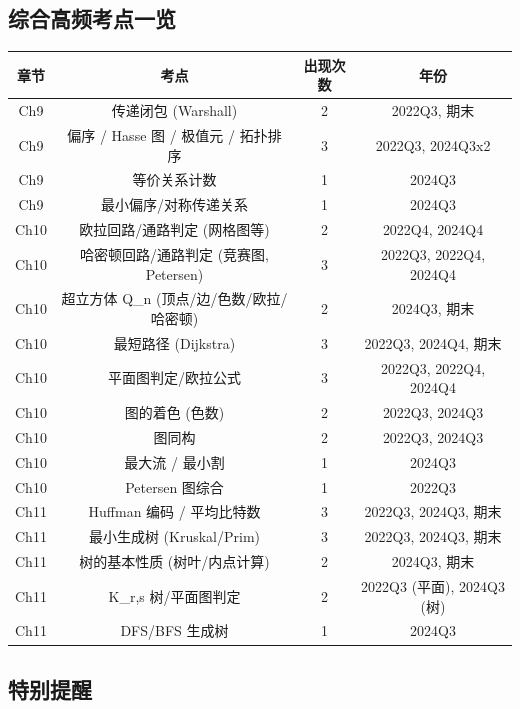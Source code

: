 \documentclass[10pt,a4paper,openany]{ctexbook}
\theoremstyle{definition}
\theoremstyle{remark}
\begin{document}
\vspace{-2pt}

\subsection{综合高频考点一览}

\begin{center}
\begin{tabular}{cccc}
\hline
章节 & 考点 & 出现次数 & 年份 \\ \hline
Ch9 & 传递闭包 (Warshall) & 2 & 2022Q3, 期末 \\
Ch9 & 偏序 / Hasse 图 / 极值元 / 拓扑排序 & 3 & 2022Q3, 2024Q3x2 \\
Ch9 & 等价关系计数 & 1 & 2024Q3 \\
Ch9 & 最小偏序/对称传递关系 & 1 & 2024Q3 \\
Ch10 & 欧拉回路/通路判定 (网格图等) & 2 & 2022Q4, 2024Q4 \\
Ch10 & 哈密顿回路/通路判定 (竞赛图, Petersen) & 3 & 2022Q3, 2022Q4, 2024Q4 \\
Ch10 & 超立方体 Q\_n (顶点/边/色数/欧拉/哈密顿) & 2 & 2024Q3, 期末 \\
Ch10 & 最短路径 (Dijkstra) & 3 & 2022Q3, 2024Q4, 期末 \\
Ch10 & 平面图判定/欧拉公式 & 3 & 2022Q3, 2022Q4, 2024Q4 \\
Ch10 & 图的着色 (色数) & 2 & 2022Q3, 2024Q3 \\
Ch10 & 图同构 & 2 & 2022Q3, 2024Q3 \\
Ch10 & 最大流 / 最小割 & 1 & 2024Q3 \\
Ch10 & Petersen 图综合 & 1 & 2022Q3 \\
Ch11 & Huffman 编码 / 平均比特数 & 3 & 2022Q3, 2024Q3, 期末 \\
Ch11 & 最小生成树 (Kruskal/Prim) & 3 & 2022Q3, 2024Q3, 期末 \\
Ch11 & 树的基本性质 (树叶/内点计算) & 2 & 2024Q3, 期末 \\
Ch11 & K\_{r,s} 树/平面图判定 & 2 & 2022Q3 (平面), 2024Q3 (树) \\
Ch11 & DFS/BFS 生成树 & 1 & 2024Q3 \\
\hline
\end{tabular}

\end{center}

\vspace{-2pt}

\subsection{特别提醒}
\end{document}
